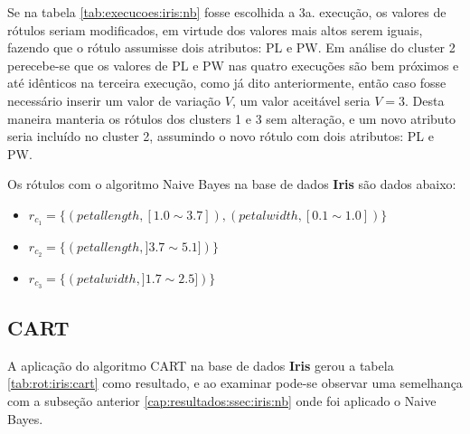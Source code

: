 Se na tabela \ref{tab:execucoes:iris:nb} fosse escolhida a 3a. execução, os valores de rótulos seriam modificados, em virtude dos valores mais altos serem iguais, fazendo que o rótulo assumisse dois atributos: PL e PW. Em análise do cluster 2 perecebe-se que os valores de PL e PW nas quatro execuções são bem próximos e até idênticos na terceira execução, como já dito anteriormente, então caso fosse necessário inserir um valor de variação ${V}$, um valor aceitável seria ${V=3}$. Desta maneira manteria os rótulos dos clusters 1 e 3 sem alteração, e um novo atributo seria incluído no cluster 2, assumindo o novo rótulo com dois atributos: PL e PW.

Os rótulos com o algoritmo Naive Bayes na base de dados \textbf{Iris} são dados abaixo:
\begin{itemize}[noitemsep]
 \item ${r_{c_1}=\{ (petallength, [ 1.0 \sim 3.7]), (petalwidth,[ 0.1 \sim 1.0 ] ) \} }$  
 \item ${r_{c_2}=\{ (petallength, ] 3.7 \sim 5.1]) \} }$
 \item ${r_{c_3}=\{ (petalwidth, ] 1.7 \sim 2.5 ]) \} }$
\end{itemize}

\subsection{CART} \label{cap:resultados:ssec:iris:cart}

A aplicação do algoritmo CART na base de dados \textbf{Iris} gerou a tabela \ref{tab:rot:iris:cart} como resultado, e ao examinar pode-se observar uma semelhança com a subseção anterior \ref{cap:resultados:ssec:iris:nb} onde foi aplicado o Naive Bayes. 

